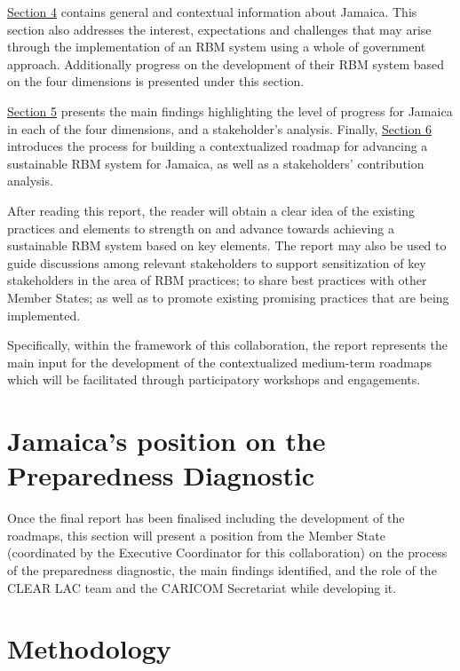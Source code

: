 \documentclass[
  10pt,
]{book}
\begin{document}
\protect\hyperlink{section4}{Section 4} contains general and contextual information about Jamaica. This section also addresses the interest, expectations and challenges that may arise through the implementation of an RBM system using a whole of government approach. Additionally progress on the development of their RBM system based on the four dimensions is presented under this section.

\protect\hyperlink{section5}{Section 5} presents the main findings highlighting the level of progress for Jamaica in each of the four dimensions, and a stakeholder's analysis. Finally, \protect\hyperlink{sectionux5cux26}{Section 6} introduces the process for building a contextualized roadmap for advancing a sustainable RBM system for Jamaica, as well as a stakeholders' contribution analysis.

After reading this report, the reader will obtain a clear idea of the existing practices and elements to strength on and advance towards achieving a sustainable RBM system based on key elements. The report may also be used to guide discussions among relevant stakeholders to support sensitization of key stakeholders in the area of RBM practices; to share best practices with other Member States; as well as to promote existing promising practices that are being implemented.

Specifically, within the framework of this collaboration, the report represents the main input for the development of the contextualized medium-term roadmaps which will be facilitated through participatory workshops and engagements.

\hypertarget{section2}{%
\chapter{Jamaica's position on the Preparedness Diagnostic}\label{section2}}

{ Once the final report has been finalised including the development of the roadmaps, this section will present a position from the Member State (coordinated by the Executive Coordinator for this collaboration) on the process of the preparedness diagnostic, the main findings identified, and the role of the CLEAR LAC team and the CARICOM Secretariat while developing it. }

\hypertarget{section3}{%
\chapter{Methodology}\label{section3}}
\end{document}
